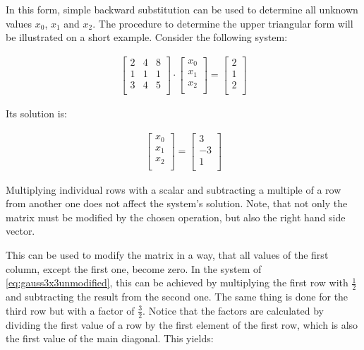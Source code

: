 \documentclass[fontsize = 10pt,DIV = 13]{scrartcl}
\begin{document}
In this form, simple backward substitution can be used to determine all unknown values $x_0$, $x_1$ and $x_2$.
The procedure to determine the upper triangular form will be illustrated on a short example.
Consider the following system:

\begin{align}
\label{eq:gauss3x3unmodified}
\begin{bmatrix}
	2&4&8\\
	1&1&1\\
	3&4&5\\
\end{bmatrix}
\cdot
\begin{bmatrix}
x_0\\
x_1\\
x_2\\
\end{bmatrix}
=
\begin{bmatrix}
2\\
1\\
2\\
\end{bmatrix}
\end{align}

Its solution is:

\begin{align*}
\begin{bmatrix}
	x_0\\
	x_1\\
	x_2\\
\end{bmatrix}
=
\begin{bmatrix}
	3\\
	-3\\
	1\\
\end{bmatrix}
\end{align*}


Multiplying individual rows with a scalar and subtracting a multiple of a row from another one does not affect the system's solution.
Note, that not only the matrix must be modified by the chosen operation, but also the right hand side vector.


This can be used to modify the matrix in a way, that all values of the first column, except the first one, become zero.
In the system of \cref{eq:gauss3x3unmodified}, this can be achieved by multiplying the first row with $\frac{1}{2}$ and subtracting the result from the second one.
The same thing is done for the third row but with a factor of $\frac{3}{2}$.
Notice that the factors are calculated by dividing the first value of a row by the first element of the first row, which is also the first value of the main diagonal.
This yields:
\end{document}
